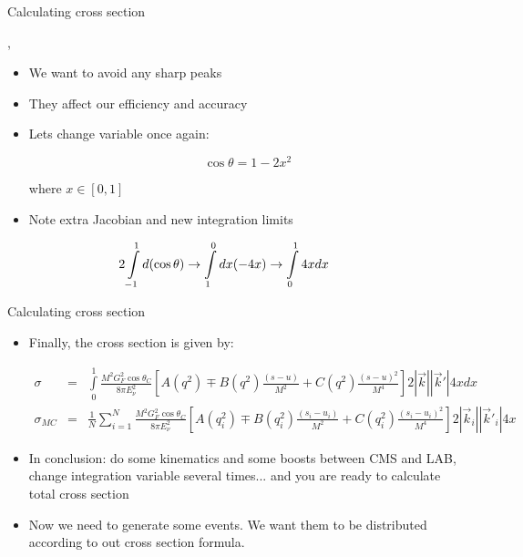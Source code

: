 \begin{slide}[toc=]{Calculating cross section}
\null\vfill

  \twocolumn
  {
    \sep
    \begin{itemize}
      \item We want to avoid any sharp peaks
      \item They affect our efficiency and accuracy
      \item Lets change variable once again:
      
      $$\cos\theta = 1 - 2x^2$$
     
      where $x\in[0,1]$
      
      \item Note extra Jacobian and new integration limits
      
    \end{itemize}
    
    \vspace{-20pt}$$\hspace*{-20pt}2\int\limits_{-1}^1 d(\cos\theta) \rightarrow \int\limits_1^0 dx (-4x) \rightarrow \int\limits_0^1 4xdx$$
  }
  {
    
    \vspace{-10pt}
    
  }
  
\vfill\null
\end{slide}

\begin{wideslide}[toc=]{Calculating cross section}
\null\vfill

  \begin{itemize}
    
    \item Finally, the cross section is given by:
    
    {\small
    \begin{eqnarray*}
      \sigma      & = & \int\limits_{0}^{1} \frac{M^2G_F^2\cos\theta_C}{8\pi E_\nu^2}\left[A(q^2) \mp B(q^2)\frac{(s - u)}{M^2} + C(q^2)\frac{(s - u)^2}{M^4}\right]2|\vec k||\vec k'|4xdx \\
      \sigma_{MC} & = & \frac{1}{N}\sum\limits_{i = 1}^N \frac{M^2G_F^2\cos\theta_C}{8\pi E_\nu^2}\left[A(q_i^2) \mp B(q_i^2)\frac{(s_i - u_i)}{M^2} + C(q_i^2)\frac{(s_i - u_i)^2}{M^4}\right]2|\vec k_i||\vec k'_i|4x
    \end{eqnarray*}
    }
    
    \item In conclusion: do some kinematics and some boosts between CMS and LAB, change integration variable several times... and you are ready to calculate total cross section
    
    \item Now we need to generate some events. We want them to be distributed according to out cross section formula.
      
  \end{itemize}

\vfill\null
\end{wideslide}

